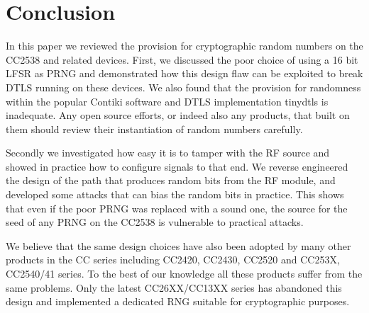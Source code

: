 \section{Conclusion}\label{Conclusion}
In this paper we reviewed the provision for cryptographic random numbers on the CC2538 and related devices. First, we discussed the poor choice of using a 16 bit LFSR as PRNG  and demonstrated how this design flaw can be exploited to break DTLS running on these devices. We also found that the provision for randomness within the popular Contiki software and DTLS implementation tinydtls is inadequate. Any open source efforts, or indeed also any products, that built on them should review their instantiation of random numbers carefully. 

Secondly we investigated how easy it is to tamper with the RF source and showed in practice how to configure signals to that end. We reverse engineered the design of the path that produces random bits from the RF module, and developed some attacks that can bias the random bits in practice. This shows that even if the poor PRNG was replaced with a sound one, the source for the seed of any PRNG on the CC2538 is vulnerable to practical attacks.

We believe that the same design choices have also been adopted by many other products in the CC series including CC2420\cite{CC2420Manual}, CC2430\cite{CC2430Manual}, CC2520\cite{CC2520Manual} and CC253X, CC2540/41 series\cite{CC2530Manual}. To the best of our knowledge all these products suffer from the same problems. Only the latest CC26XX/CC13XX\cite{CC26XXManual} series has abandoned this design and implemented a dedicated RNG suitable for cryptographic purposes.




